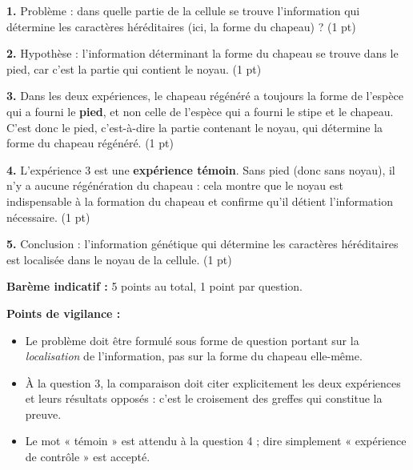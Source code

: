 \documentclass[11pt]{article}
\newcommand{\cle}[1]{{\popxbold\color{popdark}#1}}
\begin{document}
\begin{corrige}
\textbf{1.} Problème : dans quelle partie de la cellule se trouve l'information qui détermine les caractères héréditaires (ici, la forme du chapeau) ? \hfill (1 pt)

\textbf{2.} Hypothèse : l'information déterminant la forme du chapeau se trouve dans le pied, car c'est la partie qui contient le noyau. \hfill (1 pt)

\textbf{3.} Dans les deux expériences, le chapeau régénéré a toujours la forme de l'espèce qui a fourni le \textbf{pied}, et non celle de l'espèce qui a fourni le stipe et le chapeau. C'est donc le pied, c'est-à-dire la partie contenant le noyau, qui détermine la forme du chapeau régénéré. \hfill (1 pt)

\textbf{4.} L'expérience 3 est une \textbf{expérience témoin}. Sans pied (donc sans noyau), il n'y a aucune régénération du chapeau : cela montre que le noyau est indispensable à la formation du chapeau et confirme qu'il détient l'information nécessaire. \hfill (1 pt)

\textbf{5.} Conclusion : l'information génétique qui détermine les caractères héréditaires est localisée dans le \cle{noyau} de la cellule. \hfill (1 pt)

\textbf{Barème indicatif :} 5 points au total, 1 point par question.

\textbf{Points de vigilance :}
\begin{itemize}
\item Le problème doit être formulé sous forme de question portant sur la \emph{localisation} de l'information, pas sur la forme du chapeau elle-même.
\item À la question 3, la comparaison doit citer explicitement les deux expériences et leurs résultats opposés : c'est le croisement des greffes qui constitue la preuve.
\item Le mot « témoin » est attendu à la question 4 ; dire simplement « expérience de contrôle » est accepté.
\end{itemize}
\end{corrige}
\end{document}
